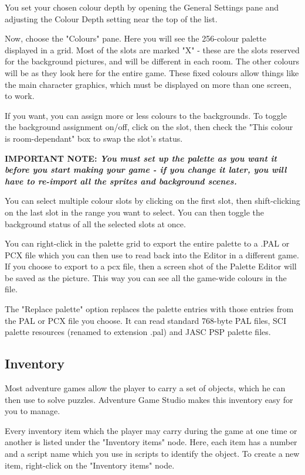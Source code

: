 You set your chosen colour depth by opening the General Settings pane and
adjusting the Colour Depth setting near the top of the list.

Now, choose the "Colours" pane. Here you will see the 256-colour
palette displayed in a grid. Most of the slots are marked "X" - these are the
slots reserved for the background pictures, and will be different in each
room. The other colours will be as they look here for the entire game. These
fixed colours allow things like the main character graphics, which must be
displayed on more than one screen, to work.

If you want, you can assign more or less colours to the backgrounds. To toggle
the background assignment on/off, click on the slot, then check the
"This colour is room-dependant" box to swap the slot's status.

\bf{IMPORTANT NOTE:} \it{You must set up the palette as you want it before you start
making your game - if you change it later, you will have to re-import all the
sprites and background scenes.}

You can select multiple colour slots by clicking on the first slot, then
shift-clicking on the last slot in the range you want to select. You can then
toggle the background status of all the selected slots at once.

You can right-click in the palette grid to export the entire palette to
a .PAL or PCX file which you can then use to read back into the Editor in
a different game.
If you choose to export to a pcx file, then a screen shot of the Palette Editor will
be saved as the picture. This way you can see all the game-wide colours in
the file.

The "Replace palette" option replaces the palette entries with those
entries from the PAL or PCX file you choose. It can read standard 768-byte
PAL files, SCI palette resources (renamed to extension .pal) and JASC PSP
palette files.

\subsection{Inventory}%

Most adventure games allow the player to carry a set of objects, which he can
then use to solve puzzles. Adventure Game Studio makes this inventory easy
for you to manage.

Every inventory item which the player may carry during the game at one time
or another is listed under the "Inventory items" node. Here, each item
has a number and a script name which you use in scripts to identify the object.
To create a new item, right-click on the "Inventory items" node.

